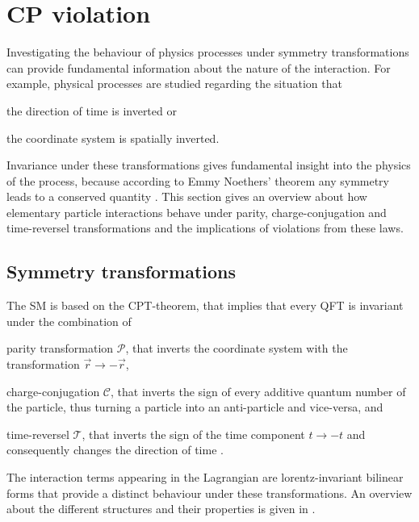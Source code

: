 \section{CP violation}
Investigating the behaviour of physics processes under symmetry transformations can provide fundamental information about the nature of the interaction.
For example, physical processes are studied regarding the situation that 
\begin{ct_version_list}
    \item the direction of time is inverted or
    \item the coordinate system is spatially inverted.
\end{ct_version_list}
Invariance under these transformations gives fundamental insight into the physics of the process, because according to 
Emmy Noethers' theorem any symmetry leads to a conserved quantity \cite{zbMATH02611626,zbMATH02611883}.
This section gives an overview about how elementary particle interactions behave under 
parity, charge-conjugation and time-reversel transformations and the implications of violations from these laws.
\newpage{}
\subsection{Symmetry transformations}
The SM is based on the CPT-theorem, that implies that every QFT is invariant under the combination of 
\begin{ct_version_list}
    \item parity transformation $\mathcal{P}$, that inverts the coordinate system with the transformation $\vec{r}\rightarrow -\vec{r}$,
    \item charge-conjugation $\mathcal{C}$, that inverts the sign of every additive quantum number of the particle, thus turning a particle into an anti-particle and vice-versa, and 
    \item time-reversel $\mathcal{T}$, that inverts the sign of the time component $t\rightarrow -t$ and consequently changes the direction of time \cite{CPT_lueders,Pauli1988}. 
\end{ct_version_list}
The interaction terms appearing in the Lagrangian are lorentz-invariant bilinear forms that provide a distinct behaviour under these transformations. An overview about 
the different structures and their properties is given in .

